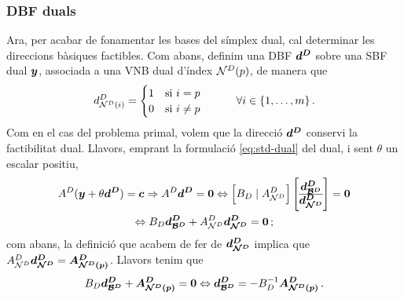 \subsubsection{DBF duals}
Ara, per acabar de fonamentar les bases del símplex dual, cal determinar les direccions bàsiques factibles. Com abans, definim una DBF $\boldsymbol{d^D}$ sobre una SBF dual $\boldsymbol{y}$, associada a una VNB dual d'índex $\mathcal{N}^D(p)$, de manera que
\[
	{d^D_{\mathcal{N}^D(i)}} =
	\begin{cases}
		1 \quad \text{si } i = p\\
		0 \quad \text{si } i \ne p
	\end{cases}
	\qquad \forall i \in \{1,\ldots,m\}\,.
\]
Com en el cas del problema primal, volem que la direcció $\boldsymbol{d^D}$ conservi la factibilitat dual. Llavors, emprant la formulació \eqref{eq:std-dual} del dual, i sent $\theta$ un escalar positiu,
\begin{multline*}
	A^D(\vb{y}+\theta\vb{d^D}) = \vb{c} \Rightarrow A^D\vb{d^D} = \vb{0} \Leftrightarrow \left[B_D \;\vert\; A^D_{\N^D} \right]
	\left[
	\begin{array}{@{}c@{}}
		\vb{d^D_{\B^D}}\\
		\hline
		\vb{d^D_{\N^D}}
	\end{array}
	\right]
	= \vb{0}\\
	\Leftrightarrow
	B_D\vb{d^D_{\B^D}} + A^D_{\N^D}\vb{d^D_{\N^D}} = \vb{0}\,;
\end{multline*}
com abans, la definició que acabem de fer de $\boldsymbol{d^D_{\mathcal{N}^D}}$ implica que $A^D_{\mathcal{N}^D}\boldsymbol{d^D_{\mathcal{N}^D}} = \boldsymbol{A^D_{\mathcal{N}^D(p)}}$. Llavors tenim que
\begin{equation}\label{eq:DBF-dual}
	B_D\boldsymbol{d^D_{\mathcal{B}^D}} + \boldsymbol{A^D_{\mathcal{N}^D(p)}} = \boldsymbol{0} \Leftrightarrow \boldsymbol{d^D_{\mathcal{B}^D}} = -B^{-1}_D \boldsymbol{A^D_{\mathcal{N}^D(p)}}\,. 
\end{equation}

